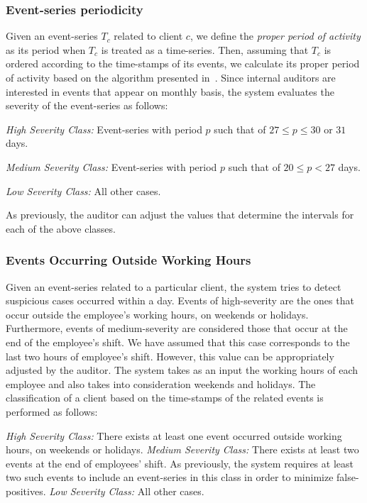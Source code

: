 \documentclass[conference]{IEEEtran}
\begin{document}
\subsubsection{Event-series periodicity}
\label{subsec:periodicity}

Given an event-series $T_c$ related to client $c$, we define the
\emph{proper period of activity} as its period when $T_c$ is treated
as a time-series. Then, assuming that $T_c$ is ordered according to
the time-stamps of its events, we calculate its proper period of
activity based on the algorithm presented in~\cite{AS12}. Since
internal auditors are interested in events that appear on monthly
basis, the system evaluates the severity of the event-series as
follows:

\emph{High Severity Class:} Event-series with period $p$ such that
of $27 \leq p \leq 30$ or $31$ days.

\emph{Medium Severity Class:} Event-series with period $p$ such that
of $20 \leq p < 27$ days.

\emph{Low Severity Class:} All other cases.

As previously, the auditor can adjust the values that determine the
intervals for each of the above classes.

\subsubsection{Events Occurring Outside Working Hours}

Given an event-series related to a particular client, the system
tries to detect suspicious cases occurred within a day. Events of
high-severity are the ones that occur outside the employee's working
hours, on weekends or holidays. Furthermore, events of
medium-severity are considered those that occur at the end of the
employee's shift. We have assumed that this case corresponds to the
last two hours of employee's shift. However, this value can be
appropriately adjusted by the auditor. The system takes as an input
the working hours of each employee and also takes into consideration
weekends and holidays. The classification of a client based on the
time-stamps of the related events is performed as follows:

\emph{High Severity Class: }There exists at least one event
  occurred outside working hours, on weekends or holidays.
\emph{Medium Severity Class: }There exists at least two events at
  the end of employees' shift. As previously, the system requires
  at least two such events to include an event-series in this class in order to minimize false-positives.
\emph{Low Severity Class:} All other cases.
\end{document}
